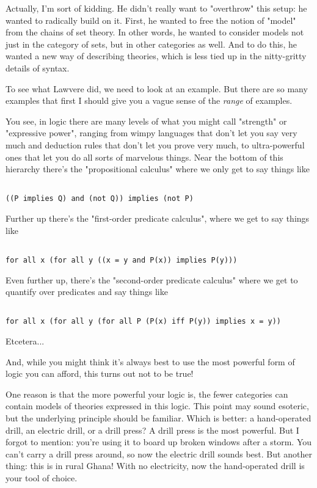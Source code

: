 Actually, I'm sort of kidding.  He didn't really want to
"overthrow" this setup: he wanted to radically build on it.
First, he wanted to free the notion of "model" from the
chains of set theory.  In other words, he wanted to consider models
not just in the category of sets, but in other categories as well.
And to do this, he wanted a new way of describing theories, which is
less tied up in the nitty-gritty details of syntax.

To see what Lawvere did, we need to look at an example.  But there
are so many examples that first I should give you a vague sense of the
\emph{range} of examples.  

You see, in logic there are many levels of what you might call
"strength" or "expressive power", ranging from
wimpy languages that don't let you say very much and deduction rules
that don't let you prove very much, to ultra-powerful ones that let
you do all sorts of marvelous things.  Near the bottom of this
hierarchy there's the "propositional calculus" where we only
get to say things like


\begin{verbatim}

((P implies Q) and (not Q)) implies (not P)
\end{verbatim}
    
Further up there's the "first-order predicate calculus",
where we get to say things like


\begin{verbatim}

for all x (for all y ((x = y and P(x)) implies P(y)))
\end{verbatim}
    
Even further up, there's the "second-order predicate calculus" where 
we get to quantify over predicates and say things like


\begin{verbatim}

for all x (for all y (for all P (P(x) iff P(y)) implies x = y))
\end{verbatim}
    
Etcetera...  

And, while you might think it's always best to use the most powerful 
form of logic you can afford, this turns out not to be true!

One reason is that the more powerful your logic is, the fewer categories
can contain models of theories expressed in this logic.  This point may
sound esoteric, but the underlying principle should be familiar.  Which
is better: a hand-operated drill, an electric drill, or a drill press?  
A drill press is the most powerful.  But I forgot to mention: you're 
using it to board up broken windows after a storm.  You can't carry a
drill press around, so now the electric drill sounds best.  But another
thing: this is in rural Ghana!  With no electricity, now the hand-operated 
drill is your tool of choice.


